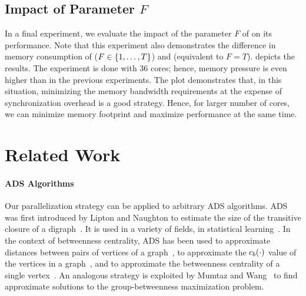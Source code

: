 \subsection{Impact of Parameter $F$}
%
In a final experiment, we evaluate the impact of the parameter $F$ of
\sharedframe on its performance. Note that this experiment also
demonstrates the difference in memory consumption of \sharedframe
($F \in \set{1, \ldots, T}$) and \localframe (equivalent to
$F = T$).  depicts the results.
%
The experiment is done with $36$ cores; hence, memory pressure
is even higher than in the previous experiments.
The plot demonstrates that, in this situation, minimizing the
memory bandwidth requirements at the expense of synchronization
overhead is a good strategy. Hence, for larger number of cores,
we can minimize memory footprint and maximize performance
at the same time.

\section{Related Work}
\label{sec:betw-apx:related-work}
%
\paragraph{ADS Algorithms}
%
Our parallelization strategy can be applied to arbitrary ADS algorithms. ADS
was first introduced by Lipton and Naughton to estimate the size of the
transitive closure of a digraph~\cite{DBLP:conf/vldb/LiptonN89}. It is used in
a variety of fields, \eg in statistical
learning~\cite{DBLP:conf/kdd/ProvostJO99}.
%
In the context of betweenness centrality, ADS has been used to approximate
distances between pairs of vertices of a graph~\cite{oktay2011distance}, to
approximate the $c_b(\cdot)$ value of the vertices in a
graph~\cite{DBLP:conf/waw/BaderKMM07,DBLP:conf/waw/BaderKMM07,DBLP:journals/tkdd/RiondatoU18},
and to approximate the betweenness centrality of a single
vertex~\cite{DBLP:journals/corr/abs-1810-10094}. An analogous strategy is
exploited by Mumtaz and Wang~\cite{DBLP:conf/cikm/MumtazW17} to find
approximate solutions to the group-betweenness maximization problem.

